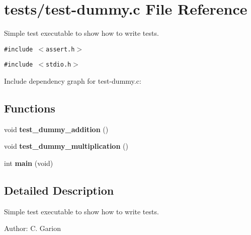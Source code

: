 \hypertarget{test-dummy_8c}{
\section{tests/test-dummy.c File Reference}
\label{test-dummy_8c}
}
Simple test executable to show how to write tests.  


{\tt \#include $<$assert.h$>$}\par
{\tt \#include $<$stdio.h$>$}\par


Include dependency graph for test-dummy.c:\subsection*{Functions}
\begin{CompactItemize}
\item 
\hypertarget{test-dummy_8c_c81b2b338f084df96004c22061366c57}{
void \textbf{test\_\-dummy\_\-addition} ()}
\label{test-dummy_8c_c81b2b338f084df96004c22061366c57}

\item 
\hypertarget{test-dummy_8c_55e81192e1d17764ce2c4c8a0fa65f70}{
void \textbf{test\_\-dummy\_\-multiplication} ()}
\label{test-dummy_8c_55e81192e1d17764ce2c4c8a0fa65f70}

\item 
\hypertarget{test-dummy_8c_840291bc02cba5474a4cb46a9b9566fe}{
int \textbf{main} (void)}
\label{test-dummy_8c_840291bc02cba5474a4cb46a9b9566fe}

\end{CompactItemize}


\subsection{Detailed Description}
Simple test executable to show how to write tests. 

\begin{Desc}
\item[Author:]C. Garion \end{Desc}
